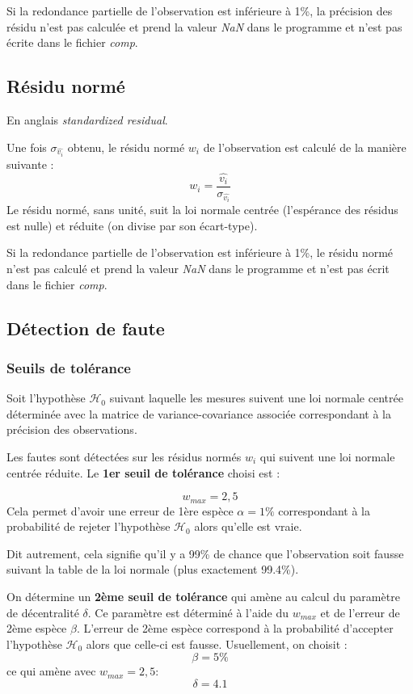 \documentclass[french]{report}
\begin{document}
Si la redondance partielle de l'observation est inférieure à 1\%, la précision des résidu n'est pas calculée et prend la valeur \textit{NaN} dans le programme et n'est pas écrite dans le fichier \textit{comp}.


\subsection{Résidu normé}\label{standardized}

En anglais \textit{standardized residual}.

Une fois $\sigma_{\hat{v_i}}$ obtenu, le résidu normé $w_i$ de l'observation est calculé de la manière suivante :
$$w_i=\frac{\hat{v_i}}{\sigma_{\hat{v_i}}}$$
Le résidu normé, sans unité, suit la loi normale centrée (l'espérance des résidus est nulle) et réduite (on divise par son écart-type).

Si la redondance partielle de l'observation est inférieure à 1\%, le résidu normé n'est pas calculé et prend la valeur \textit{NaN} dans le programme et n'est pas écrit dans le fichier \textit{comp}.



\subsection{Détection de faute}


\subsubsection{Seuils de tolérance}

Soit l'hypothèse $\mathcal{H}_0$ suivant laquelle les mesures suivent une loi normale centrée
déterminée avec la matrice de variance-covariance associée correspondant à la précision des observations.

Les fautes sont détectées sur les résidus normés $w_i$ qui suivent une loi normale centrée réduite. Le \textbf{1er seuil de tolérance} choisi est :

$$w_{max}=2,5$$
Cela permet d'avoir une erreur de 1ère espèce $\alpha=1\%$ correspondant à la probabilité de rejeter l'hypothèse $\mathcal{H}_0$ alors qu'elle est vraie.

Dit autrement, cela signifie qu'il y a 99\% de chance que l'observation soit fausse suivant la table de la loi normale (plus exactement 99.4\%).

On détermine un \textbf{2ème seuil de tolérance} qui amène au calcul du paramètre de décentralité $\delta$.
Ce paramètre est déterminé à l'aide du $w_{max}$ et de l'erreur de 2ème espèce $\beta$.
L'erreur de 2ème espèce correspond à la probabilité d'accepter l'hypothèse $\mathcal{H}_0$ alors que celle-ci est fausse.
Usuellement, on choisit :
$$\beta=5\%$$
ce qui amène avec $w_{max}=2,5$:
$$\delta=4.1$$
\end{document}
